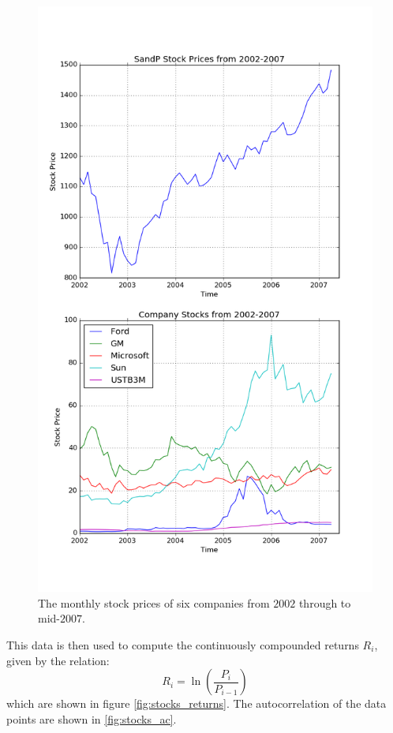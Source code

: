 \message{ !name(Assn2.tex)}\documentclass[twocolumn]{article}
\begin{document}
\begin{figure}
  \includegraphics[width=\linewidth]{stocks_time.png}
  \caption{
    The monthly stock prices of six companies from $2002$ through to mid-$2007$.
  }
  \label{fig:stocks_time}
\end{figure}

This data is then used to compute the continuously compounded returns $R_i$,
given by the relation:
\begin{equation}
  R_i = \ln\left( \frac{P_i}{P_{i-1}} \right)
  \label{ccr}
\end{equation}
which are shown in figure \ref{fig:stocks_returns}. The autocorrelation of the
data points are shown in \ref{fig:stocks_ac}. 
\end{document}

